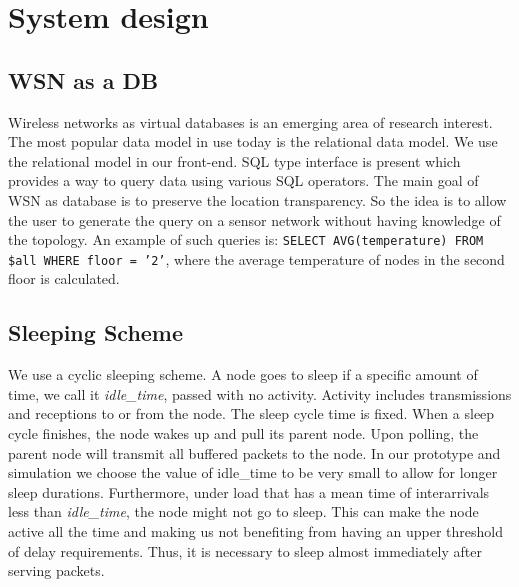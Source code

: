 \section{System design}\label{sec:design}

\subsection{WSN as a DB}
Wireless networks as virtual databases is an emerging area of research interest. The most popular data model in use today is the relational data model. We use the relational model in our front-end. SQL type interface is present which provides a way to query data using various SQL operators. The main goal of WSN as database is to preserve the location transparency. So the idea is to allow the user to generate the query on a sensor network without having knowledge of the topology. An example of such queries is: \texttt{SELECT AVG(temperature) FROM \$all WHERE floor = '2'}, where the average temperature of nodes in the second floor is calculated.

\subsection{Sleeping Scheme}
We use a cyclic sleeping scheme. A node goes to sleep if a specific amount of time, we call it \emph{idle\_time}, passed with no activity. Activity includes transmissions and receptions to or from the node. The sleep cycle time is fixed. When a sleep cycle finishes, the node wakes up and pull its parent node. Upon polling, the parent node will transmit all buffered packets to the node. In our prototype and simulation we choose the value of idle\_time to be very small to allow for longer sleep durations. Furthermore, under load that has a mean time of interarrivals less than \emph{idle\_time}, the node might not go to sleep. This can make the node active all the time and making us not benefiting from having an upper threshold of delay requirements. Thus, it is necessary to sleep almost immediately after serving packets.

